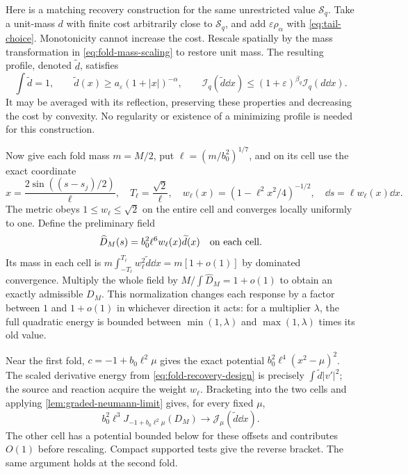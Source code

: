 Here is a matching recovery construction for the same unrestricted
value $\mathcal S_q$. Take a unit-mass $d$ with finite cost arbitrarily
close to $\mathcal S_q$, and add $\varepsilon\rho_\alpha$ with
\eqref{eq:tail-choice}. Monotonicity cannot increase the cost.
Rescale spatially by the mass transformation in
\eqref{eq:fold-mass-scaling} to restore unit mass. The resulting
profile, denoted $\widetilde d$, satisfies
\begin{equation}\label{eq:near-optimal-positive-profile}
 \int\widetilde d=1,\qquad
 \widetilde d(x)\ge a_\varepsilon(1+|x|)^{-\alpha},\qquad
 \mathscr I_q(\widetilde d\dd x)
       \le(1+\varepsilon)^{\beta_q}\mathscr I_q(d\dd x).
\end{equation}
It may be averaged with its reflection, preserving these properties
and decreasing the cost by convexity. No regularity or existence of
a minimizing profile is needed for this construction.

Now give each fold mass $m=M/2$, put
$\ell=(m/b_0^2)^{1/7}$, and on its cell use the exact coordinate
\[
 x=\frac{2\sin((s-s_j)/2)}\ell,\quad
 T_\ell=\frac{\sqrt2}\ell,\quad
 w_\ell(x)=(1-\ell^2x^2/4)^{-1/2},\quad
 \dd s=\ell w_\ell(x)\dd x.
\]
The metric obeys $1\le w_\ell\le\sqrt2$ on the entire cell and
converges locally uniformly to one. Define the preliminary field
\begin{equation}\label{eq:fold-recovery-design}
 \widehat D_M(s)=b_0^2\ell^6 w_\ell(x)\widetilde d(x)
 \quad\hbox{on each cell}.
\end{equation}
Its mass in each cell is
$m\int_{-T_\ell}^{T_\ell}w_\ell^2\widetilde d\dd x=m[1+o(1)]$
by dominated convergence. Multiply the whole field by
$M/\int\widehat D_M=1+o(1)$ to obtain an exactly admissible $D_M$.
This normalization changes each response by a factor between
$1$ and $1+o(1)$ in whichever direction it acts: for a multiplier
$\lambda$, the full quadratic energy is bounded between
$\min(1,\lambda)$ and $\max(1,\lambda)$ times its old value.

Near the first fold, $c=-1+b_0\ell^2\mu$ gives the exact potential
$b_0^2\ell^4(x^2-\mu)^2$. The scaled derivative energy from
\eqref{eq:fold-recovery-design} is precisely
$\int\widetilde d|v'|^2$; the source and reaction acquire the weight
$w_\ell$. Bracketing into the two cells and applying
\cref{lem:graded-neumann-limit} gives, for every fixed $\mu$,
\begin{equation}\label{eq:fold-recovery-pointwise}
 b_0^2\ell^3J_{-1+b_0\ell^2\mu}(D_M)
       \longrightarrow\mathscr J_\mu(\widetilde d\dd x).
\end{equation}
The other cell has a potential bounded below for these offsets and
contributes $O(1)$ before rescaling. Compact supported tests give
the reverse bracket. The same argument holds at the second fold.

